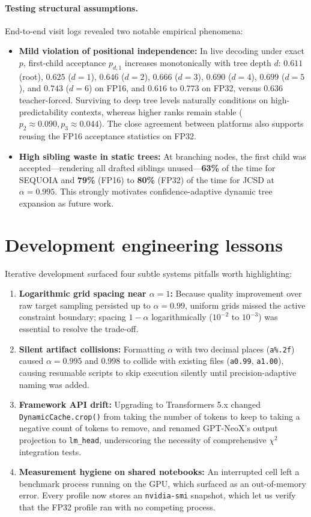 \documentclass[10pt]{article}
\begin{document}
\paragraph{Testing structural assumptions.} End-to-end visit logs revealed two notable empirical phenomena:
\begin{itemize}
    \item \textbf{Mild violation of positional independence:} In live decoding under exact $p$, first-child acceptance $p_{d,1}$ increases monotonically with tree depth $d$: $0.611$ (root), $0.625$ ($d=1$), $0.646$ ($d=2$), $0.666$ ($d=3$), $0.690$ ($d=4$), $0.699$ ($d=5$), and $0.743$ ($d=6$) on FP16, and $0.616$ to $0.773$ on FP32, versus $0.636$ teacher-forced. Surviving to deep tree levels naturally conditions on high-predictability contexts, whereas higher ranks remain stable ($p_2 \approx 0.090, p_3 \approx 0.044$). The close agreement between platforms also supports reusing the FP16 acceptance statistics on FP32.
    \item \textbf{High sibling waste in static trees:} At branching nodes, the first child was accepted—rendering all drafted siblings unused—\textbf{63\%} of the time for SEQUOIA and \textbf{79\%} (FP16) to \textbf{80\%} (FP32) of the time for JCSD at $\alpha = 0.995$. This strongly motivates confidence-adaptive dynamic tree expansion as future work.
\end{itemize}

\section{Development engineering lessons}

Iterative development surfaced four subtle systems pitfalls worth highlighting:
\begin{enumerate}
    \item \textbf{Logarithmic grid spacing near $\alpha = 1$:} Because quality improvement over raw target sampling persisted up to $\alpha = 0.99$, uniform grids missed the active constraint boundary; spacing $1 - \alpha$ logarithmically ($10^{-2}$ to $10^{-3}$) was essential to resolve the trade-off.
    \item \textbf{Silent artifact collisions:} Formatting $\alpha$ with two decimal places (\texttt{a\%.2f}) caused $\alpha = 0.995$ and $0.998$ to collide with existing files (\texttt{a0.99}, \texttt{a1.00}), causing resumable scripts to skip execution silently until precision-adaptive naming was added.
    \item \textbf{Framework API drift:} Upgrading to Transformers 5.x changed \texttt{DynamicCache.crop()} from taking the number of tokens to keep to taking a negative count of tokens to remove, and renamed GPT-NeoX's output projection to \texttt{lm\_head}, underscoring the necessity of comprehensive $\chi^2$ integration tests.
    \item \textbf{Measurement hygiene on shared notebooks:} An interrupted cell left a benchmark process running on the GPU, which surfaced as an out-of-memory error. Every profile now stores an \texttt{nvidia-smi} snapshot, which let us verify that the FP32 profile ran with no competing process.
\end{enumerate}
\end{document}
